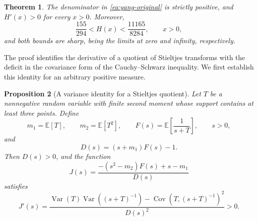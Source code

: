 \documentclass[11pt,a4paper]{article}
\newtheorem{theorem}{Theorem}[section]
\newtheorem{proposition}[theorem]{Proposition}
\theoremstyle{definition}
\theoremstyle{remark}
\newcommand{\E}{\mathbb E}
\DeclareMathOperator{\Var}{Var}
\DeclareMathOperator{\Cov}{Cov}
\numberwithin{equation}{section}
\begin{document}
\begin{theorem}\label{thm:yang-quotient}
The denominator in \eqref{eq:yang-original} is strictly positive, and
$H'(x)>0$ for every $x>0$. Moreover,
\begin{equation}\label{eq:yang-sharp-range}
 \frac{155}{294}<H(x)<\frac{11165}{8284},\qquad x>0,
\end{equation}
and both bounds are sharp, being the limits at zero and infinity,
respectively.
\end{theorem}

The proof identifies the derivative of a quotient of Stieltjes transforms
with the deficit in the covariance form of the Cauchy--Schwarz inequality.
We first establish this identity for an arbitrary positive measure.

\begin{proposition}[A variance identity for a Stieltjes quotient]
\label{prop:yang-variance}
Let $T$ be a nonnegative random variable with finite second moment whose
support contains at least three points. Define
\[
 m_1=\E[T],\qquad m_2=\E[T^2],\qquad
 F(s)=\E\!\left[\frac1{s+T}\right],\qquad s>0,
\]
and
\[
 D(s)=(s+m_1)F(s)-1.
\]
Then $D(s)>0$, and the function
\begin{equation}\label{eq:yang-J}
 J(s)=\frac{-(s^2-m_2)F(s)+s-m_1}{D(s)}
\end{equation}
satisfies
\begin{equation}\label{eq:yang-variance-identity}
 J'(s)=
 \frac{\Var(T)\Var((s+T)^{-1})
          -\Cov(T,(s+T)^{-1})^2}{D(s)^2}>0.
\end{equation}
\end{proposition}
\end{document}
